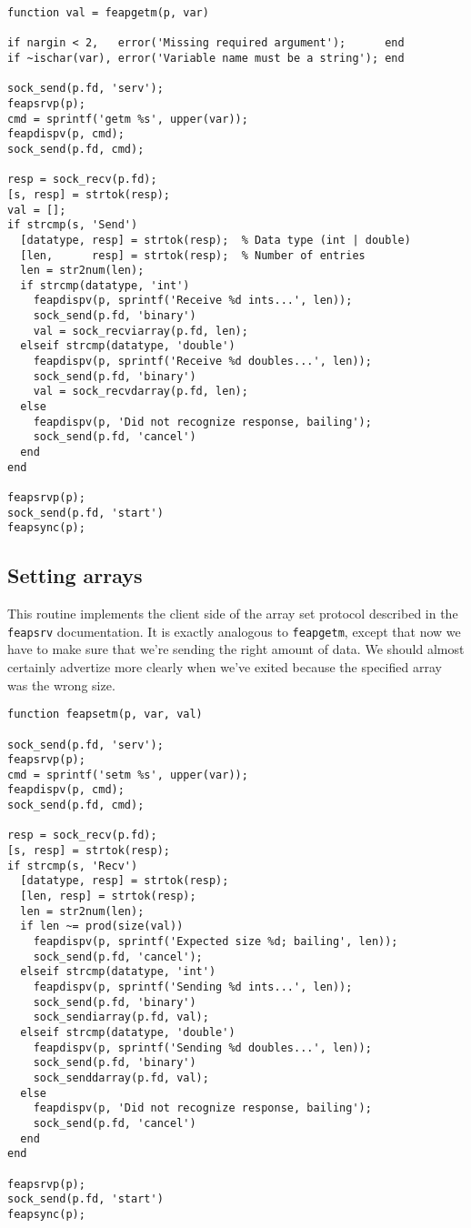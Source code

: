 \begin{verbatim}
function val = feapgetm(p, var)

if nargin < 2,   error('Missing required argument');      end
if ~ischar(var), error('Variable name must be a string'); end

sock_send(p.fd, 'serv');
feapsrvp(p);
cmd = sprintf('getm %s', upper(var));
feapdispv(p, cmd);
sock_send(p.fd, cmd);

resp = sock_recv(p.fd);
[s, resp] = strtok(resp);
val = [];
if strcmp(s, 'Send')
  [datatype, resp] = strtok(resp);  % Data type (int | double)
  [len,      resp] = strtok(resp);  % Number of entries
  len = str2num(len);
  if strcmp(datatype, 'int')
    feapdispv(p, sprintf('Receive %d ints...', len));
    sock_send(p.fd, 'binary')
    val = sock_recviarray(p.fd, len);
  elseif strcmp(datatype, 'double')
    feapdispv(p, sprintf('Receive %d doubles...', len));
    sock_send(p.fd, 'binary')
    val = sock_recvdarray(p.fd, len);
  else
    feapdispv(p, 'Did not recognize response, bailing');
    sock_send(p.fd, 'cancel')
  end
end

feapsrvp(p);
sock_send(p.fd, 'start')
feapsync(p);
\end{verbatim}
\subsection{Setting arrays}

This routine implements the client side of the array set
protocol described in the {\tt feapsrv} documentation.  It is
exactly analogous to {\tt feapgetm}, except that now we have to
make sure that we're sending the right amount of data.  We should
almost certainly advertize more clearly when we've exited because
the specified array was the wrong size.

\begin{verbatim}
function feapsetm(p, var, val)

sock_send(p.fd, 'serv');
feapsrvp(p);
cmd = sprintf('setm %s', upper(var));
feapdispv(p, cmd);
sock_send(p.fd, cmd);

resp = sock_recv(p.fd);
[s, resp] = strtok(resp);
if strcmp(s, 'Recv')
  [datatype, resp] = strtok(resp);
  [len, resp] = strtok(resp);
  len = str2num(len);
  if len ~= prod(size(val))
    feapdispv(p, sprintf('Expected size %d; bailing', len));
    sock_send(p.fd, 'cancel');
  elseif strcmp(datatype, 'int')
    feapdispv(p, sprintf('Sending %d ints...', len));
    sock_send(p.fd, 'binary')
    sock_sendiarray(p.fd, val);
  elseif strcmp(datatype, 'double')
    feapdispv(p, sprintf('Sending %d doubles...', len));
    sock_send(p.fd, 'binary')
    sock_senddarray(p.fd, val);
  else
    feapdispv(p, 'Did not recognize response, bailing');
    sock_send(p.fd, 'cancel')
  end
end

feapsrvp(p);
sock_send(p.fd, 'start')
feapsync(p);
\end{verbatim}
